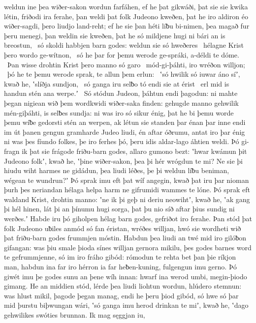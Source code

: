 weldun ine þea wiðer-sakon wordun farfáhen,
ef he þat gikwáði, þat sie sie kwika létin,
friðodi ira ferahe, þan weldi þat folk Judeono
kweðen, þat he iro aldiron éo wiðer-sagdi,
þero liudjo land-reht; ef he sie þan héti líƀu bi-nimen,
þea magað fur þeru menegi, þan weldin sie kweðen, þat he só mildjene hugi
ni bári an is breostun, \hld\ só skoldi habbjen barn godes:
weldun sie só hweðeres \hld\ hélagne Krist
þero wordo ge-wítnon, \hld\ só he þar for þemu werode ge-spráki,
a-déldi te dóme. \hld\ Þan wisse drohtin Krist
þero manno só garo \hld\ mód-gi-þáhti,
iro wréðon willjon; \hld\ þó he te þemu werode sprak,
te allun þem erlun: \hld\ ʽsó hwilik só iuwar áno síʼ, kwað he,
ʽslíðja sundjon, \hld\ só ganga iru selƀo tó
endi sie at érist \hld\ erl mid is handun
stén ana werpe.ʼ \hld\ Só stódun Judeon,
þáhtun endi þagodun: ni mahte þegan nigiean
wið þem wordkwidi wiðer-saka finden:
gehugde manno gehwilik mén-giþáhti,
is selƀes sundja: ni was iro só sikur énig,
þat he bi þemu worde þemu wíƀe gedorsti
stén an werpen, ak létun sie standen þar
énan þar inne endi im út þanen
gengun gramharde Judeo liudi,
én aftar óðrumu, antat iro þar énig ni was
þes fíundo folkes, þe iro ferhes þó,
þeru idis aldar-lago áhtien weldi.
Þó gi-fragn ik þat sie frágode friðu-barn godes,
allaro gumono bezt: ʽhwar kwámun þit Judeono folkʼ, kwað he,
ʽþine wiðer-sakon, þea þi hér wrógdun te mi?
Ne sie þi hiudu wiht harmes ne gidádun,
þea liudi léðes, þe þi weldun líƀu beniman,
wégean te wundrun?ʼ Þó sprak imu eft þat wíf angegin,
kwað þat iru þar nioman þurh þes neriandan
hélaga helpa harm ne gifrumidi
wammes te lóne. Þó sprak eft waldand Krist,
drohtin manno: ʽne ik þi geþ ni deriu neowihtʼ, kwað he,
ʽak gang þi hél hinen, lát þi an þínumu hugi sorga,
þat þu nio síð aftar þius sundig ni werðes.ʼ
Habde iru þó giholpen hélag barn godes,
gefriðot iro ferahe. Þan stód þat folk Judeono
uƀiles anmód só fan éristan,
wréðes willjan, hwó sie wordheti
wið þat friðu-barn godes frummjen móstin.
Habdun þea liudi an twé mid iro gilóƀon gifangan:
was þiu smale þioda sínes willjan
gernora mikilu, þes godes barnes word
te gefrummjenne, só im iro fráho gibód:
rómodun te rehta bet þan þie ríkjon man,
habdun ina far iro hérron ia far heƀen-kuning,
fulgengun imu gerno. Þó giwét imu þe godes sunu
an þene wíh innan: hwarf ina werod umbi,
megin-þiodo gimang. He an middien stód,
lérde þea liudi liohtun wordun,
hlúdero stemnun: was hlust mikil,
þagode þegan manag, endi he þeru þiod gibód,
só hwe só þar mid þurstu biþwungan wári,
ʽsó ganga imu herod drinkan te miʼ, kwað he, ʽdago gehwilikes
swóties brunnan. Ik mag sęggjan iu,
